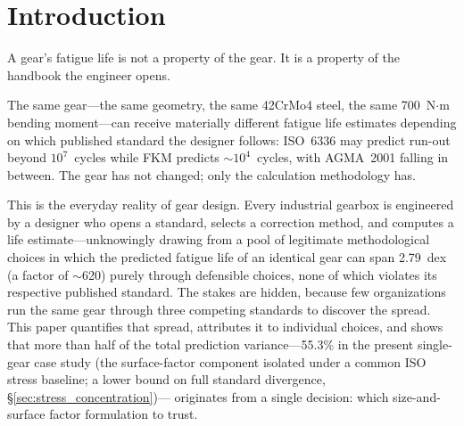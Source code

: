 \documentclass[twocolumn,12pt,a4paper]{article}
\begin{document}
\begin{abstract}
A gear's fatigue life, this study demonstrates, is not a fixed
material property: it depends on the calculation methodology chosen.
The framework presented here provides a general, factor-level-agnostic
template for quantifying method-induced uncertainty in other machine
elements, while all numerical results remain specific to the single
gear and loading condition analyzed.

\textbf{Keywords:} gear fatigue, uncertainty quantification, AFT survival analysis,
surface roughness, ISO 6336, AGMA 2001, FKM, S--N curve
\end{abstract}

\section{Introduction}
\label{sec:intro}

A gear's fatigue life is not a property of the gear. It is a property
of the handbook the engineer opens.

The same gear---the same geometry, the same 42CrMo4 steel, the same
700~N$\cdot$m bending moment---can receive materially different fatigue
life estimates depending on which published standard the designer
follows: ISO~6336 may predict run-out beyond $10^7$~cycles while FKM
predicts $\sim$$10^4$~cycles, with AGMA~2001 falling in between. The
gear has not changed; only the calculation methodology has.

This is the everyday reality of gear design. Every industrial gearbox
is engineered by a designer who opens a standard, selects a correction
method, and computes a life estimate---unknowingly drawing from a pool
of legitimate methodological choices in which the predicted fatigue
life of an identical gear can span 2.79~dex (a factor of $\sim$620)
purely through defensible choices, none of which violates its
respective published standard. The stakes are hidden, because few
organizations run the same gear through three competing standards to
discover the spread. This paper quantifies that spread, attributes it
to individual choices, and shows that more than half of the total
prediction variance---55.3\% in the present single-gear case study %
(the surface-factor component isolated under a common ISO stress
baseline; a lower bound on full standard divergence,
\S\ref{sec:stress_concentration})---
originates from a single decision: which size-and-surface factor
formulation to trust.
\end{document}
